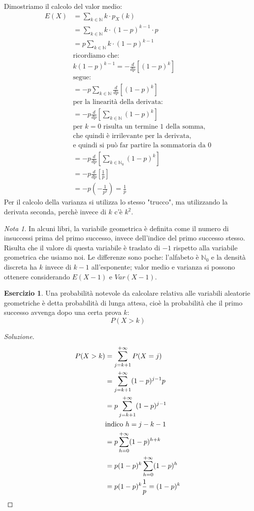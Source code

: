 \documentclass{article}
\theoremstyle{plain}
\theoremstyle{definition}
\newtheorem{esercizio}{Esercizio}[section]
\theoremstyle{remark}
\newtheorem*{nota}{Nota}
\newenvironment{soluzione}
	{\renewcommand\qedsymbol{$\mathwitch*$}\begin{proof}[Soluzione]}
	{\end{proof}}
\renewcommand{\qedsymbol}{$\mathrightghost$}
\begin{document}
Dimostriamo il calcolo del valor medio:
\begin{align*}
	E(X)&=\sum_{k\in\mathds{N}}k\cdot p_X(k)\\
	&=\sum_{k\in\mathds{N}}k\cdot(1-p)^{k-1}\cdot p\\
	&=p\sum_{k\in\mathds{N}}k\cdot(1-p)^{k-1}\\
	&\text{ricordiamo che:}\\
	&k(1-p)^{k-1}=-\frac{d}{dp}[(1-p)^k]\\
	&\text{segue:}\\
	&=-p\sum_{k\in\mathds{N}}\frac{d}{dp}[(1-p)^k]\\
	&\text{per la linearità della derivata:}\\
	&=-p\frac{d}{dp}\left[\sum_{k\in\mathds{N}}(1-p)^k\right]\\
	&\text{per $k=0$ risulta un termine $1$ della somma,}\\
	&\text{che quindi è irrilevante per la derivata,}\\
	&\text{e quindi si può far partire la sommatoria da $0$}\\
	&=-p\frac{d}{dp}\left[\sum_{k\in\mathds{N}_0}(1-p)^k\right]\\
	&=-p\frac{d}{dp}\left[\frac{1}{p}\right]\\
	&=-p\left(-\frac{1}{p^2}\right)=\frac{1}{p}
\end{align*}
Per il calcolo della varianza si utilizza lo stesso "trucco", ma utilizzando la derivata seconda, perchè invece di $k$ c'è $k^2$.
\begin{nota}
	In alcuni libri, la variabile geometrica è definita come il numero di insuccessi prima del primo successo, invece dell'indice del primo successo stesso. Risulta che il valore di questa variabile è traslato di $-1$ rispetto alla variabile geometrica che usiamo noi. Le differenze sono poche: l'alfabeto è $\mathds{N}_0$ e la densità discreta ha $k$ invece di $k-1$ all'esponente; valor medio e varianza si possono ottenere considerando $E(X-1)$ e $Var(X-1)$.
\end{nota}
\begin{esercizio}
	Una probabilità notevole da calcolare relativa alle variabili aleatorie geometriche è detta probabilità di lunga attesa, cioè la probabilità che il primo successo avvenga dopo una certa prova $k$:
	\begin{equation*}
		P(X>k)
	\end{equation*}
	\begin{soluzione}
		\begin{align*}
			P(X>k)&=\sum_{j=k+1}^{+\infty}P(X=j)\\
			&=\sum_{j=k+1}^{+\infty}(1-p)^{j-1}p\\
			&=p\sum_{j=k+1}^{+\infty}(1-p)^{j-1}\\
			&\text{indico }h=j-k-1\\
			&=p\sum_{h=0}^{+\infty}(1-p)^{h+k}\\
			&=p(1-p)^k\sum_{h=0}^{+\infty}(1-p)^h\\
			&=p(1-p)^k\frac{1}{p}=(1-p)^k\qedhere
		\end{align*}
	\end{soluzione}
\end{esercizio}
\end{document}
